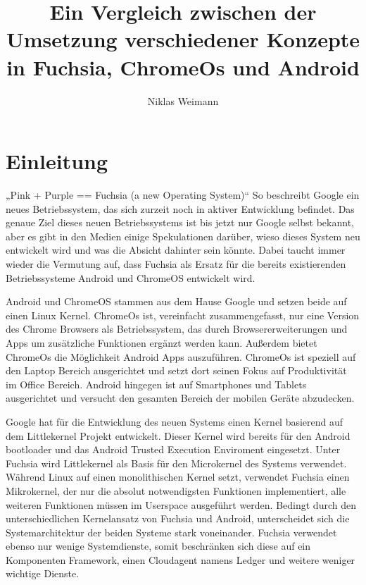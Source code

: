 \documentclass[a4paper]{scrartcl}
\begin{document}
\title{Ein Vergleich zwischen der Umsetzung verschiedener Konzepte in Fuchsia, ChromeOs und Android}
\author{Niklas Weimann}
\date{}

\maketitle
\tableofcontents
\newpage

\section{Einleitung}
„Pink + Purple == Fuchsia (a new Operating System)“\cite{fuchsia.Gettingstarted} So beschreibt Google ein neues Betriebssystem, das sich zurzeit noch in aktiver Entwicklung befindet. Das genaue Ziel dieses neuen Betriebssystems ist bis jetzt nur Google selbst bekannt, aber es gibt in den Medien einige Spekulationen darüber, wieso dieses System neu entwickelt wird und was die Absicht dahinter sein könnte. Dabei taucht immer wieder die Vermutung auf, dass Fuchsia als Ersatz für die bereits existierenden Betriebssysteme Android und ChromeOS entwickelt wird.\cite{DaveAltavilla.30.Juni2019}

Android und ChromeOS stammen aus dem Hause Google und setzen beide auf  einen Linux Kernel.  ChromeOs ist, vereinfacht zusammengefasst, nur eine Version des Chrome Browsers als Betriebssystem, das durch Browsererweiterungen und Apps um zusätzliche Funktionen ergänzt werden kann. Außerdem bietet ChromeOs die Möglichkeit Android Apps auszuführen. ChromeOs ist speziell auf den Laptop Bereich ausgerichtet und setzt dort seinen Fokus auf Produktivität im Office Bereich. Android hingegen ist auf Smartphones und Tablets ausgerichtet und versucht den gesamten Bereich der mobilen Geräte abzudecken.

Google hat für die Entwicklung des neuen Systems einen Kernel basierend auf dem Littlekernel Projekt entwickelt. Dieser Kernel wird bereits für den Android bootloader \cite{Android.LittleKernel} und das Android Trusted Execution Enviroment \cite{Android.TrustyTee} eingesetzt. Unter Fuchsia wird Littlekernel als Basis für den Microkernel des Systems verwendet. Während Linux auf einen monolithischen Kernel setzt, verwendet Fuchsia einen Mikrokernel, der nur die absolut notwendigsten Funktionen implementiert, alle weiteren Funktionen müssen im Userspace ausgeführt werden. Bedingt durch den unterschiedlichen Kernelansatz von Fuchsia und Android, unterscheidet sich die Systemarchitektur der beiden Systeme stark voneinander. Fuchsia verwendet ebenso nur wenige Systemdienste, somit beschränken sich diese auf ein Komponenten Framework, einen Cloudagent namens Ledger und weitere weniger wichtige Dienste.
\end{document}

